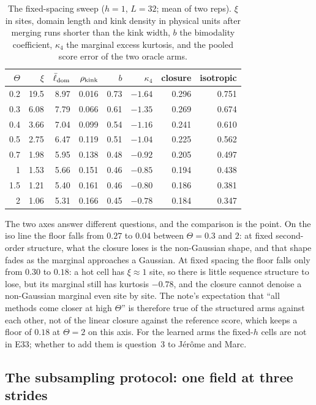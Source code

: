 \documentclass[10pt,a4paper]{article}
\newcommand{\Th}{\Theta}
\theoremstyle{plain}
\theoremstyle{remark}
\begin{document}
\begin{table}[h]\centering\footnotesize
\caption{The fixed-spacing sweep ($h=1$, $L=32$; mean of two reps). $\xi$ in sites, domain length and
kink density in physical units after merging runs shorter than the kink width, $b$ the bimodality
coefficient, $\kappa_4$ the marginal excess kurtosis, and the pooled score error of the two
oracle arms.}
\label{tab:sweep}
\begin{tabular}{@{}rrrrrrrr@{}}
\toprule
$\Th$ & $\xi$ & $\bar\ell_{\rm dom}$ & $\rho_{\rm kink}$ & $b$ & $\kappa_4$ & closure & isotropic \\
\midrule
0.2 & 19.5 & 8.97 & 0.016 & 0.73 & $-1.64$ & 0.296 & 0.751 \\
0.3 & 6.08 & 7.79 & 0.066 & 0.61 & $-1.35$ & 0.269 & 0.674 \\
0.4 & 3.66 & 7.04 & 0.099 & 0.54 & $-1.16$ & 0.241 & 0.610 \\
0.5 & 2.75 & 6.47 & 0.119 & 0.51 & $-1.04$ & 0.225 & 0.562 \\
0.7 & 1.98 & 5.95 & 0.138 & 0.48 & $-0.92$ & 0.205 & 0.497 \\
1   & 1.53 & 5.66 & 0.151 & 0.46 & $-0.85$ & 0.194 & 0.438 \\
1.5 & 1.21 & 5.40 & 0.161 & 0.46 & $-0.80$ & 0.186 & 0.381 \\
2   & 1.06 & 5.31 & 0.166 & 0.45 & $-0.78$ & 0.184 & 0.347 \\
\bottomrule
\end{tabular}
\end{table}

The two axes answer different questions, and the comparison is the point. On the iso line the
floor falls from $0.27$ to $0.04$ between $\Th=0.3$ and $2$: at fixed second-order structure, what
the closure loses is the non-Gaussian shape, and that shape fades as the marginal approaches a
Gaussian. At fixed spacing the floor falls only from $0.30$ to $0.18$: a hot cell has $\xi\approx1$
site, so there is little sequence structure to lose, but its marginal still has kurtosis $-0.78$,
and the closure cannot denoise a non-Gaussian marginal even site by site. The note's expectation
that ``all methods come closer at high $\Th$'' is therefore true of the structured arms against
each other, not of the linear closure against the reference score, which keeps a floor of $0.18$ at
$\Th=2$ on this axis. For the learned arms the fixed-$h$ cells are not in E33; whether to add them
is question~3 to Jérôme and Marc.

\subsection{The subsampling protocol: one field at three strides}\label{sec:stride}
\end{document}
